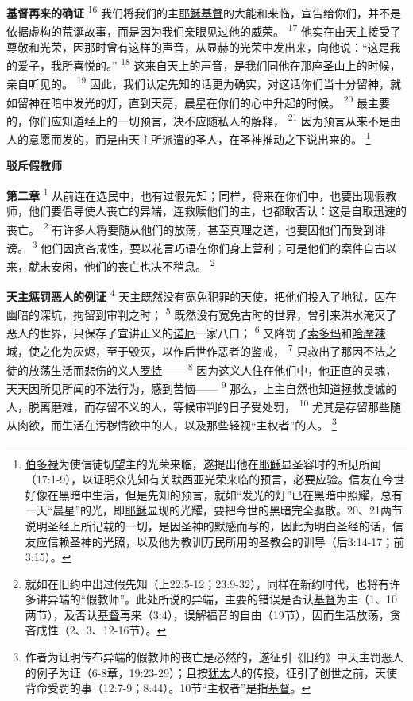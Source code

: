 \textbf{基督再来的确证\quad}
\textsuperscript{16}
我们将我们的主\uline{耶稣}\uline{基督}的大能和来临，宣告给你们，并不是依据虚构的荒诞故事，而是因为我们亲眼见过他的威荣。
\textsuperscript{17}
他实在由天主接受了尊敬和光荣，因那时曾有这样的声音，从显赫的光荣中发出来，向他说：“这是我的爱子，我所喜悦的。”
\textsuperscript{18}
这来自天上的声音，是我们同他在那座圣山上的时候，亲自听见的。
\textsuperscript{19}
因此，我们认定先知的话更为确实，对这话你们当十分留神，就如留神在暗中发光的灯，直到天亮，晨星在你们的心中升起的时候。
\textsuperscript{20}
最主要的，你们应知道经上的一切预言，决不应随私人的解释，
\textsuperscript{21}
因为预言从来不是由人的意愿而发的，而是由天主所派遣的圣人，在圣神推动之下说出来的。
\footnote{\uline{伯多禄}为使信徒切望主的光荣来临，遂提出他在\uline{耶稣}显圣容时的所见所闻（17:1-9），以证明众先知有关默西亚光荣来临的预言，必要应验。信友在今世好像在黑暗中生活，但是先知的预言，就如“发光的灯”已在黑暗中照耀，总有一天“晨星”的光，即\uline{耶稣}显现的光耀，要把今世的黑暗完全驱散。20、21两节说明圣经上所记载的一切，是因圣神的默感而写的，因此为明白圣经的话，信友应信赖圣神的光照，以及他为教训万民所用的圣教会的训导（后3:14-17；前3:15）。}

\begin{center}
	\textbf{\large{\songti 驳斥假教师}}
\end{center}

\textbf{第二章\quad}
\textsuperscript{1}
从前连在选民中，也有过假先知；同样，将来在你们中，也要出现假教师，他们要倡导使人丧亡的异端，连救赎他们的主，也都敢否认：这是自取迅速的丧亡。
\textsuperscript{2}
有许多人将要随从他们的放荡，甚至真理之道，也要因他们而受到诽谤。
\textsuperscript{3}
他们因贪吝成性，要以花言巧语在你们身上营利；可是他们的案件自古以来，就未安闲，他们的丧亡也决不稍息。
\footnote{就如在旧约中出过假先知（上22:5-12；23:9-32），同样在新约时代，也将有许多讲异端的“假教师”。此处所说的异端，主要的错误是否认\uline{基督}为主（1、10两节），及否认\uline{基督}再来（3:4），误解福音的自由（19节），因而生活放荡，贪吝成性（2、3、12-16节）。}

\textbf{天主惩罚恶人的例证\quad}
\textsuperscript{4}
天主既然没有宽免犯罪的天使，把他们投入了地狱，囚在幽暗的深坑，拘留到审判之时；
\textsuperscript{5}
既然没有宽免古时的世界，曾引来洪水淹灭了恶人的世界，只保存了宣讲正义的\uline{诺厄}一家八口；
\textsuperscript{6}
又降罚了\uline{索多玛}和\uline{哈摩辣}城，使之化为灰烬，至于毁灭，以作后世作恶者的鉴戒，
\textsuperscript{7}
只救出了那因不法之徒的放荡生活而悲伤的义人\uline{罗特}——
\textsuperscript{8}
因为这义人住在他们中，他正直的灵魂，天天因所见所闻的不法行为，感到苦恼——
\textsuperscript{9}
那么，上主自然也知道拯救虔诚的人，脱离磨难，而存留不义的人，等候审判的日子受处罚，
\textsuperscript{10}
尤其是存留那些随从肉欲，而生活在污秽情欲中的人，以及那些轻视“主权者”的人。
\footnote{作者为证明传布异端的假教师的丧亡是必然的，遂征引《旧约》中天主罚恶人的例子为证（6-8章，19:23-29）；且按\uline{犹太}人的传授，征引了创世之前，天使背命受罚的事（12:7-9；8:44）。10节“主权者”是指\uline{基督}。}

